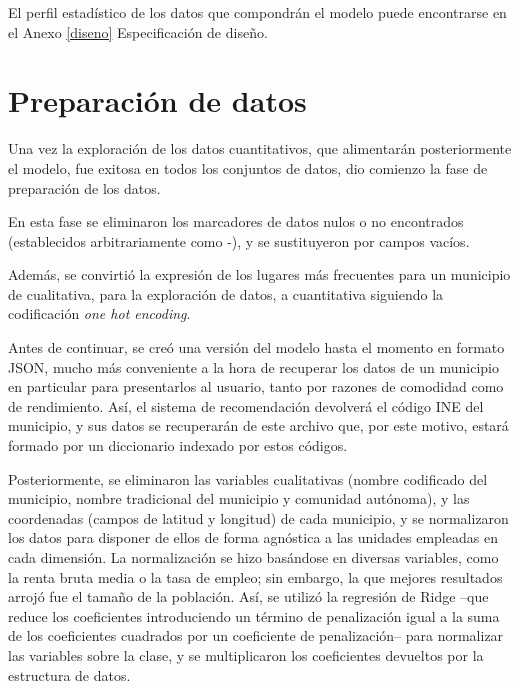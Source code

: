 El perfil estadístico de los datos que compondrán el modelo puede encontrarse en el Anexo \ref{diseno} \guillemotleft Especificación de diseño\guillemotright.

\section{Preparación de datos}

Una vez la exploración de los datos cuantitativos, que alimentarán posteriormente el modelo, fue exitosa en todos los conjuntos de datos, dio comienzo la fase de preparación de los datos.

En esta fase se eliminaron los marcadores de datos nulos o no encontrados (establecidos arbitrariamente como \guillemotleft -\guillemotright), y se sustituyeron por campos vacíos.


Además, se convirtió la expresión de los lugares más frecuentes para un municipio de cualitativa, para la exploración de datos, a cuantitativa siguiendo la codificación \textit{one hot encoding}.


Antes de continuar, se creó una versión del modelo hasta el momento en formato JSON, mucho más conveniente a la hora de recuperar los datos de un municipio en particular para presentarlos al usuario, tanto por razones de comodidad como de rendimiento. Así, el sistema de recomendación devolverá el código INE del municipio, y sus datos se recuperarán de este archivo que, por este motivo, estará formado por un diccionario indexado por estos códigos.

Posteriormente, se eliminaron las variables cualitativas (nombre codificado del municipio, nombre tradicional del municipio y comunidad autónoma), y las coordenadas (campos de latitud y longitud) de cada municipio, y se normalizaron los datos para disponer de ellos de forma agnóstica a las unidades empleadas en cada dimensión. La normalización se hizo basándose en diversas variables, como la renta bruta media o la tasa de empleo; sin embargo, la que mejores resultados arrojó fue el tamaño de la población. Así, se utilizó la regresión de Ridge –que reduce los coeficientes introduciendo un término de penalización igual a la suma de los coeficientes cuadrados por un coeficiente de penalización– para normalizar las variables sobre la clase, y se multiplicaron los coeficientes devueltos por la estructura de datos.

